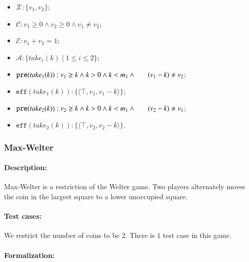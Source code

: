 \documentclass[review]{elsarticle}
\newcommand{\set}[1]{\{ #1 \}}
\newcommand{\tuple}[1]{\langle {#1} \rangle}
\newcommand{\true}{\top}
\newcommand{\statevar}{\mathcal{X}}
\newcommand{\act}{\mathcal{A}}
\newcommand{\constraint}{\mathcal{C}}
\newcommand{\estate}{\mathcal{E}}
\newcommand{\pre}{\mathtt{pre}}
\newcommand{\eff}{\mathtt{eff}}
\begin{document}
\begin{itemize}
	\item $\statevar: \set{v_1, v_2}$;
	\item $\constraint: v_1 \ge 0 \wedge v_2 \ge 0  \wedge v_1 \neq v_2$;
	\item $\estate: v_1+v_2= 1 $;
	\item $\act:\set{take_i(k){\mid}1\le i \le2}$;
	\item $\pre(take_1(k)) :  v_1 \ge k \wedge k > 0 \wedge k < m_1 \wedge \\ \hspace*{6mm}
	(v_1-k) \neq v_2 $;
	\item $\eff(take_1(k)) : \set{\tuple{\true,  v_1,  v_1 - k}}$;
	\item $\pre(take_2(k)) :  v_2 \ge k \wedge k > 0 \wedge k < m_1 \wedge \\\\ \hspace*{6mm}
	(v_2-k) \neq v_1 $;
	
	\item $\eff(take_2(k)) : \set{\tuple{\true,  v_2,  v_2 - k}}$.
\end{itemize}




\subsubsection{Max-Welter \protect\cite{Ho2014}}

\paragraph{Description:} 
Max-Welter is a restriction of the Welter game.
Two players alternately moves the coin in the largest square to a lower unoccupied square. 

\paragraph{Test cases:}
We restrict the number of coins to be $2$. 
There is $1$ test case in this game.

\paragraph{Formalization:}
\end{document}
